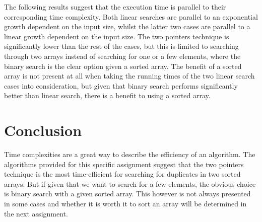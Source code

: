 \documentclass[a4paper,11pt]{article}
\begin{document}
    The following results suggest that the execution time is parallel to their corresponding time complexity. Both linear searches are parallel to an exponential growth dependent on the input size, whilst the latter two cases are parallel to a linear growth dependent on the input size. The two pointers technique is significantly lower than the rest of the cases, but this is limited to searching through two arrays instead of searching for one or a few elements, where the binary search is the clear option given a sorted array. The benefit of a sorted array is not present at all when taking the running times of the two linear search cases into consideration, but given that binary search performs significantly better than linear search, there is a benefit to using a sorted array.

\section*{Conclusion}
    
    Time complexities are a great way to describe the efficiency of an algorithm. The algorithms provided for this specific assignment suggest that the two pointers technique is the most time-efficient for searching for duplicates in two sorted arrays. But if given that we want to search for a few elements, the obvious choice is binary search with a given sorted array. This however is not always presented in some cases and whether it is worth it to sort an array will be determined in the next assignment.
    
\end{document}
